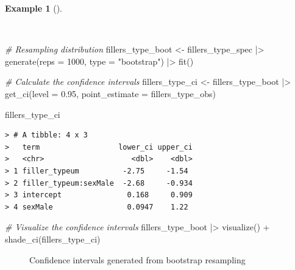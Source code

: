 \documentclass[
  letterpaper,
  DIV=11,
  numbers=noendperiod]{scrreprt}
\newenvironment{Shaded}{\begin{snugshade}}{\end{snugshade}}
\newcommand{\AttributeTok}[1]{\textcolor[rgb]{0.00,0.00,0.00}{#1}}
\newcommand{\CommentTok}[1]{\textcolor[rgb]{0.00,0.00,0.00}{\textit{#1}}}
\newcommand{\DecValTok}[1]{\textcolor[rgb]{0.00,0.00,0.00}{#1}}
\newcommand{\FloatTok}[1]{\textcolor[rgb]{0.00,0.00,0.00}{#1}}
\newcommand{\FunctionTok}[1]{\textcolor[rgb]{0.00,0.00,0.00}{#1}}
\newcommand{\NormalTok}[1]{\textcolor[rgb]{0.00,0.00,0.00}{#1}}
\newcommand{\OtherTok}[1]{\textcolor[rgb]{0.00,0.00,0.00}{#1}}
\newcommand{\SpecialCharTok}[1]{\textcolor[rgb]{0.00,0.00,0.00}{#1}}
\newcommand{\StringTok}[1]{\textcolor[rgb]{0.00,0.00,0.00}{#1}}
\theoremstyle{definition}
\newtheorem{example}{Example}[chapter]
\theoremstyle{remark}
\begin{document}
\begin{example}[]\protect\hypertarget{exm-ida-num-multi-sex-ci}{}\label{exm-ida-num-multi-sex-ci}

~

\begin{Shaded}
\begin{Highlighting}[]
\CommentTok{\# Resampling distribution}
\NormalTok{fillers\_type\_boot }\OtherTok{\textless{}{-}}
\NormalTok{  fillers\_type\_spec }\SpecialCharTok{|\textgreater{}}
  \FunctionTok{generate}\NormalTok{(}\AttributeTok{reps =} \DecValTok{1000}\NormalTok{, }\AttributeTok{type =} \StringTok{"bootstrap"}\NormalTok{) }\SpecialCharTok{|\textgreater{}}
  \FunctionTok{fit}\NormalTok{()}

\CommentTok{\# Calculate the confidence intervals}
\NormalTok{fillers\_type\_ci }\OtherTok{\textless{}{-}}
\NormalTok{  fillers\_type\_boot }\SpecialCharTok{|\textgreater{}}
  \FunctionTok{get\_ci}\NormalTok{(}\AttributeTok{level =} \FloatTok{0.95}\NormalTok{, }\AttributeTok{point\_estimate =}\NormalTok{ fillers\_type\_obs)}

\NormalTok{fillers\_type\_ci}
\end{Highlighting}
\end{Shaded}

\begin{verbatim}
> # A tibble: 4 x 3
>   term                  lower_ci upper_ci
>   <chr>                    <dbl>    <dbl>
> 1 filler_typeum          -2.75     -1.54 
> 2 filler_typeum:sexMale  -2.68     -0.934
> 3 intercept               0.168     0.909
> 4 sexMale                 0.0947    1.22
\end{verbatim}

\begin{Shaded}
\begin{Highlighting}[]
\CommentTok{\# Visualize the confidence intervals}
\NormalTok{fillers\_type\_boot }\SpecialCharTok{|\textgreater{}}
  \FunctionTok{visualize}\NormalTok{() }\SpecialCharTok{+}
  \FunctionTok{shade\_ci}\NormalTok{(fillers\_type\_ci)}
\end{Highlighting}
\end{Shaded}

\begin{figure}[H]


\caption{\label{fig-ida-num-multi-sex-ci}Confidence intervals generated
from bootstrap resampling}

\end{figure}%

\end{example}
\end{document}
